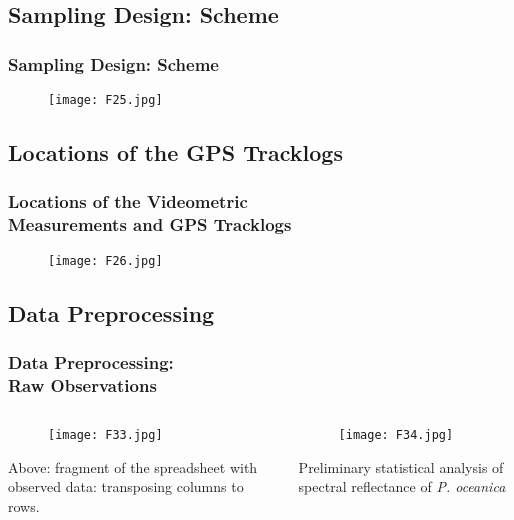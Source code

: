 \documentclass[pdflatex,compress,9pt,
	xcolor={dvipsnames,dvipsnames,svgnames,x11names,table},
	hyperref={colorlinks = true,breaklinks = true, urlcolor = NavyBlue, breaklinks = true}]{beamer}
\begin{document}
\subsection{Sampling Design: Scheme}
\begin{frame}\frametitle{Sampling Design: Scheme}
\begin{figure}[H]
	\centering
		\texttt{[image: F25.jpg]}
\end{figure}
\end{frame}

\subsection{Locations of the GPS Tracklogs}
\begin{frame}\frametitle{Locations of the Videometric \\Measurements and GPS Tracklogs}
\begin{figure}[H]
	\centering
		\texttt{[image: F26.jpg]}
\end{figure}
\end{frame}

\subsection{Data Preprocessing}
\begin{frame}\frametitle{Data Preprocessing: \\ Raw Observations}
\begin{minipage}[0.4\textheight]{\textwidth}
\begin{columns}[T]
\begin{column}{0.5\textwidth}
\vspace{2em}
\begin{figure}[H]
	\centering
		\texttt{[image: F33.jpg]}
\end{figure}
Above: fragment of the spreadsheet with observed data: transposing columns to rows.
\end{column}
\begin{column}{0.5\textwidth}
\vspace{2em} 
\begin{figure}[H]
	\centering
		\texttt{[image: F34.jpg]}
\end{figure}
Preliminary statistical analysis of spectral reflectance of \emph{P. oceanica}
\end{column}
\end{columns}
\end{minipage}
\end{frame}
\end{document}
